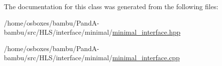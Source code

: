 The documentation for this class was generated from the following files\+:\begin{DoxyCompactItemize}
\item 
/home/osboxes/bambu/\+Pand\+A-\/bambu/src/\+H\+L\+S/interface/minimal/\hyperlink{minimal__interface_8hpp}{minimal\+\_\+interface.\+hpp}\item 
/home/osboxes/bambu/\+Pand\+A-\/bambu/src/\+H\+L\+S/interface/minimal/\hyperlink{minimal__interface_8cpp}{minimal\+\_\+interface.\+cpp}\end{DoxyCompactItemize}

